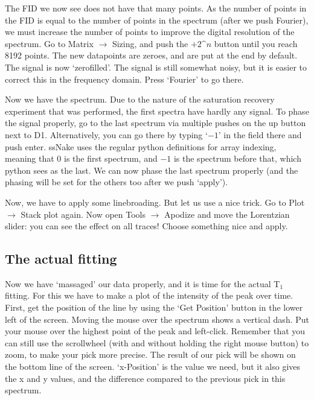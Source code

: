 \documentclass[11pt,a4paper]{article}
\begin{document}
The FID we now see does not have that many points. As the number of points in
the FID is equal to the number of points in the spectrum (after we push
Fourier), we must increase the number of points to improve the digital
resolution of the spectrum. Go to Matrix $\rightarrow$ Sizing, and push the
$+2\text{\textasciicircum}n$ button until you reach 8192 points. The new
datapoints are zeroes, and are put at the end by default. The signal is now
`zerofilled'. The signal is still somewhat noisy, but it is easier to correct
this in the frequency domain. Press `Fourier' to go there.

Now we have the spectrum. Due to the nature of the saturation recovery
experiment that was performed, the first spectra have hardly any signal. To
phase the signal properly, go to the last spectrum via multiple pushes on the
up button next to D1. Alternatively, you can go there by typing `$-1$' in the
field there and push enter. ssNake uses the regular python definitions for
array indexing, meaning that 0 is the first spectrum, and $-1$ is the spectrum
before that, which python sees as the last. We can now phase the last spectrum
properly (and the phasing will be set for the others too after we push
`apply').

Now, we have to apply some linebroading. But let us use a nice trick. Go to
Plot $\rightarrow$ Stack plot again. Now open Tools $\rightarrow$ Apodize and
move the Lorentzian slider: you can see the effect on all traces! Choose
something nice and apply. 

\subsection{The actual fitting}
Now we have `massaged' our data properly, and it is time for the actual T$_1$ fitting. For this we have to make a plot of the intensity of the peak over time. First, get the position of the line
by using the `Get Position' button in the lower left of the screen. Moving the mouse over the spectrum shows a vertical dash. Put your mouse over the highest point of the peak and left-click. Remember that you can still use the scrollwheel (with and without holding the right mouse button) to zoom, to make your pick more precise. The result of our pick will be shown on the bottom line of the screen. `x-Position' is the value we need, but it also gives the x and y values, and the difference compared to the previous pick in this spectrum.
\end{document}
